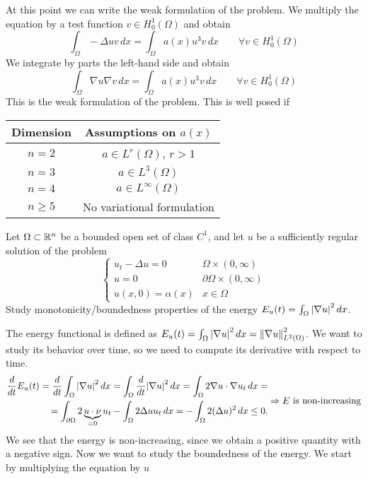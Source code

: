 At this point we can write the weak formulation of the problem. We multiply the
equation by a test function \(v \in H^1_0(\Omega)\) and obtain
\[
    \int_\Omega - \Delta u v \, dx = \int_\Omega a(x) u^3 v \, dx \qquad \forall v \in H^1_0(\Omega)
\]
We integrate by parts the left-hand side and obtain
\[
    \int_\Omega \nabla u \nabla v \, dx = \int_\Omega a(x) u^3 v \, dx \qquad \forall v \in H^1_0(\Omega)
\]
This is the weak formulation of the problem. This is well posed if
\begin{table}[h]
    \centering
    \begin{tabular}{|c|c|}
        \hline
        Dimension  & Assumptions on $a(x)$        \\
        \hline
        $n = 2$    & $a \in L^r(\Omega)$, $r > 1$ \\
        $n = 3$    & $a \in L^3(\Omega)$          \\
        $n = 4$    & $a \in L^\infty(\Omega)$     \\
        $n \geq 5$ & No variational formulation   \\
        \hline
    \end{tabular}
\end{table}
\newpage

\begin{exercise}
    Let \(\Omega \subset \mathbb{R}^n\) be a bounded open set of class \(C^1\), and let \(u\) be a sufficiently regular solution of the problem
    \[
        \begin{cases}
            u_t - \Delta u = 0  & \Omega \times (0, \infty)         \\
            u = 0               & \partial\Omega \times (0, \infty) \\
            u(x, 0) = \alpha(x) & x \in \Omega
        \end{cases}
    \]
    Study monotonicity/boundedness properties of the energy \(E_u(t) = \int_\Omega
    \abs{\nabla u}^2 \, dx\).
\end{exercise}
The energy functional is defined as \(E_u(t) = \int_\Omega \abs{\nabla u}^2 \, dx = \norm{\nabla u}^2_{L^2(\Omega)}\). We want to study its behavior over time, so we need to compute its derivative with respect to time.
\[
    \begin{split}
        \frac{d}{dt} E_u(t) = \frac{d}{dt} \int_\Omega \abs{\nabla u}^2 \, dx = \int_\Omega \frac{d}{dt} \abs{\nabla u}^2 \, dx = \int_\Omega 2 \nabla u \cdot \nabla u_t \, dx = \\
        = \int_{\partial\Omega} 2 \underbrace{u \cdot \nu}_{=0} u_t - \int_\Omega 2 \Delta u u_t \, dx = - \int_\Omega 2 (\Delta u)^2 \, dx \leq 0.
    \end{split}
    \Rightarrow E \text{ is non-increasing}
\]
We see that the energy is non-increasing, since we obtain a positive quantity
with a negative sign. Now we want to study the boundedness of the energy. We
start by multiplying the equation by \(u\)

